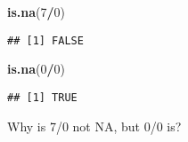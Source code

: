 \documentclass[8pt,ignorenonframetext,]{beamer}
\newenvironment{Shaded}{\begin{snugshade}}{\end{snugshade}}
\newcommand{\KeywordTok}[1]{\textcolor[rgb]{0.13,0.29,0.53}{\textbf{#1}}}
\newcommand{\DecValTok}[1]{\textcolor[rgb]{0.00,0.00,0.81}{#1}}
\newcommand{\OperatorTok}[1]{\textcolor[rgb]{0.81,0.36,0.00}{\textbf{#1}}}
\newcommand{\NormalTok}[1]{#1}
\begin{document}
\begin{frame}[fragile]{}

\begin{Shaded}
\begin{Highlighting}[]
\KeywordTok{is.na}\NormalTok{(}\DecValTok{7}\OperatorTok{/}\DecValTok{0}\NormalTok{)}
\end{Highlighting}
\end{Shaded}

\begin{verbatim}
## [1] FALSE
\end{verbatim}

\begin{Shaded}
\begin{Highlighting}[]
\KeywordTok{is.na}\NormalTok{(}\DecValTok{0}\OperatorTok{/}\DecValTok{0}\NormalTok{)}
\end{Highlighting}
\end{Shaded}

\begin{verbatim}
## [1] TRUE
\end{verbatim}

Why is 7/0 not NA, but 0/0 is?

\end{frame}
\end{document}
